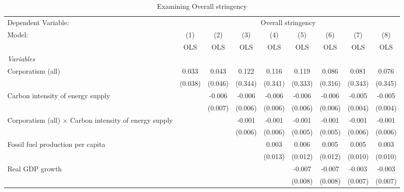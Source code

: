
\begin{table}[htbp]
   \caption{Examining Overall stringency}
   \centering
   \begin{tabular}{lcccccccc}
      \toprule
      Dependent Variable: & \multicolumn{8}{c}{Overall stringency}\\
      Model:                                                        & (1)     & (2)     & (3)     & (4)     & (5)     & (6)     & (7)     & (8)\\  
                                                                    &  OLS    & OLS     & OLS     & OLS     & OLS     & OLS     & OLS     & OLS\\  
      \midrule
      \emph{Variables}\\
      Corporatism (all)                                             & 0.033   & 0.043   & 0.122   & 0.116   & 0.119   & 0.086   & 0.081   & 0.076\\   
                                                                    & (0.038) & (0.046) & (0.344) & (0.341) & (0.333) & (0.316) & (0.343) & (0.345)\\   
      Carbon intensity of energy supply                             &         & -0.006  & -0.006  & -0.006  & -0.006  & -0.006  & -0.005  & -0.005\\   
                                                                    &         & (0.007) & (0.006) & (0.006) & (0.006) & (0.006) & (0.004) & (0.004)\\   
      Corporatism (all) $\times$ Carbon intensity of energy supply  &         &         & -0.001  & -0.001  & -0.001  & -0.001  & -0.001  & -0.001\\   
                                                                    &         &         & (0.006) & (0.006) & (0.005) & (0.005) & (0.006) & (0.006)\\   
      Fossil fuel production per capita                             &         &         &         & 0.003   & 0.006   & 0.005   & 0.005   & 0.003\\   
                                                                    &         &         &         & (0.013) & (0.012) & (0.012) & (0.010) & (0.010)\\   
      Real GDP growth                                               &         &         &         &         & -0.007  & -0.007  & -0.003  & -0.003\\   
                                                                    &         &         &         &         & (0.008) & (0.008) & (0.007) & (0.007)\\   

\end{tabular}
\end{table}
